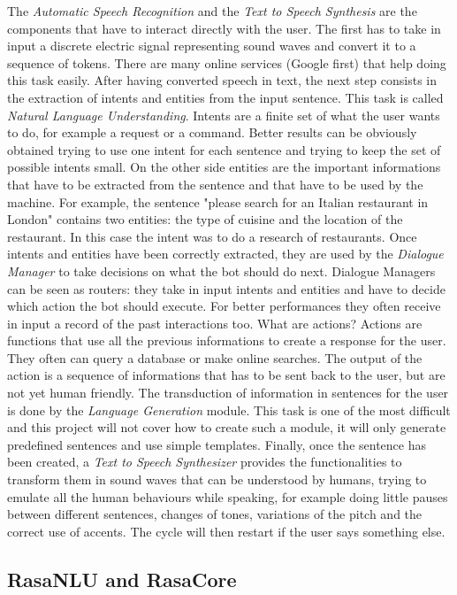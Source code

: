 \documentclass[11pt,a4paper]{article}
\begin{document}
The \textit{Automatic Speech Recognition} and the \textit{Text to Speech Synthesis} are the components that have to interact directly with the user. The first has to take in input a discrete electric signal representing sound waves and convert it to a sequence of tokens. There are many online services (Google first) that help doing this task easily.
After having converted speech in text, the next step consists in the extraction of intents and entities from the input sentence. This task is called \textit{Natural Language Understanding}. Intents are a finite set of what the user wants to do, for example a request or a command. Better results can be obviously obtained trying to use one intent for each sentence and trying to keep the set of possible intents small. On the other side entities are the important informations that have to be extracted from the sentence and that have to be used by the machine. For example, the sentence "please search for an Italian restaurant in London" contains two entities: the type of cuisine and the location of the restaurant. In this case the intent was to do a research of restaurants.
Once intents and entities have been correctly extracted, they are used by the \textit{Dialogue Manager} to take decisions on what the bot should do next. Dialogue Managers can be seen as routers: they take in input intents and entities and have to decide which action the bot should execute. For better performances they often receive in input a record of the past interactions too. What are actions? Actions are functions that use all the previous informations to create a response for the user. They often can query a database or make online searches. The output of the action is a sequence of informations that has to be sent back to the user, but are not yet human friendly. The transduction of information in sentences for the user is done by the \textit{Language Generation} module. This task is one of the most difficult and this project will not cover how to create such a module, it will only generate predefined sentences and use simple templates.
Finally, once the sentence has been created, a \textit{Text to Speech Synthesizer} provides the functionalities to transform them in sound waves that can be understood by humans, trying to emulate all the human behaviours while speaking, for example doing little pauses between different sentences, changes of tones, variations of the pitch and the correct use of accents. The cycle will then restart if the user says something else.
 
\subsection{RasaNLU and RasaCore}
\end{document}
